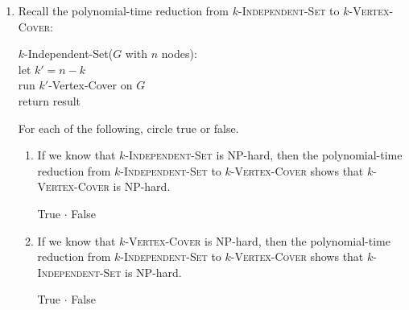\documentclass[11pt]{article}
\begin{document}
\begin{enumerate}
\begin{enumerate}
    \item Write a \emph{decision} version of \textsc{Knapsack}.
    \vspace{1in}
    \item Prove that your decision version of the \textsc{Knapsack} problem is in NP.
\end{enumerate}
\newpage

\item Recall the polynomial-time reduction from $k$-\textsc{Independent-Set} to
$k$-\textsc{Vertex-Cover}:
    \begin{algo}
    $k$-Independent-Set($G$ with $n$ nodes):\+\\
        let $k'=n - k$\\
        run $k'$-Vertex-Cover on $G$\\
        return result
    \end{algo}

For each of the following, circle true or false.

\begin{enumerate}
    \item If we know that $k$-\textsc{Independent-Set} is NP-hard, then the
    polynomial-time reduction from $k$-\textsc{Independent-Set} to
    $k$-\textsc{Vertex-Cover} shows that $k$-\textsc{Vertex-Cover} is NP-hard.

    True $\cdot$ False

    \item If we know that $k$-\textsc{Vertex-Cover} is NP-hard, then the
    polynomial-time reduction from $k$-\textsc{Independent-Set} to
    $k$-\textsc{Vertex-Cover} shows that $k$-\textsc{Independent-Set} is NP-hard.

    True $\cdot$ False
\end{enumerate}
\end{enumerate}
\end{document}
